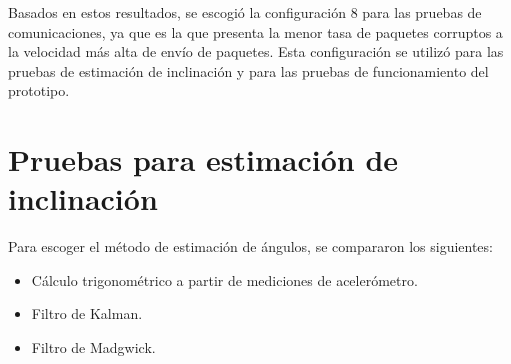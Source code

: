 \begin{table}[H]
    \centering
    \caption{Resultados de pruebas realizadas con módulo de comunicaciones Ra-02.}
    \label{tab:resultadoslora}
\end{table}

Basados en estos resultados, se escogió la configuración 8 para las pruebas de comunicaciones, ya que es la que presenta la menor tasa de paquetes corruptos a la velocidad más alta de envío de paquetes. Esta configuración se utilizó para las pruebas de estimación de inclinación y para las pruebas de funcionamiento del prototipo.

\section{Pruebas para estimación de inclinación}

Para escoger el método de estimación de ángulos, se compararon los siguientes:

\begin{itemize}
    \item Cálculo trigonométrico a partir de mediciones de acelerómetro.
    \item Filtro de Kalman.
    \item Filtro de Madgwick.
\end{itemize}

